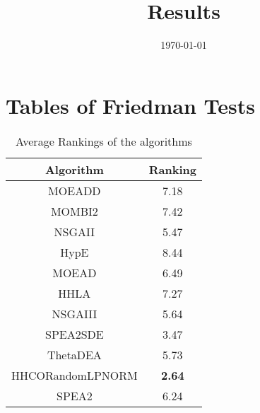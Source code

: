 \documentclass{article}
\title{Results}
\author{}
\date{\today}
\begin{document}
\oddsidemargin 0in \topmargin 0in\maketitle
\section{Tables of Friedman Tests}
\begin{table}[!htp]
\centering
\caption{Average Rankings of the algorithms
}\begin{tabular}{|c|c|}
\hline
Algorithm&Ranking\\
\hline
MOEADD&7.18\\\hline
MOMBI2&7.42\\\hline
NSGAII&5.47\\\hline
HypE&8.44\\\hline
MOEAD&6.49\\\hline
HHLA&7.27\\\hline
NSGAIII&5.64\\\hline
SPEA2SDE&3.47\\\hline
ThetaDEA&5.73\\\hline
HHCORandomLPNORM& {\bf 2.64}\\\hline
SPEA2&6.24\\\hline
\end{tabular}
\end{table}
\end{document}
